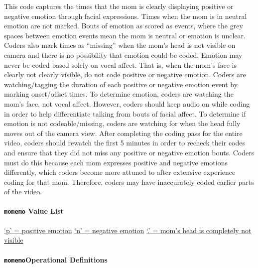 \documentclass[
]{book}
\begin{document}
This code captures the times that the mom is clearly displaying positive or negative emotion through facial expressions. Times when the mom is in neutral emotion are not marked. Bouts of emotion as scored as events, where the grey spaces between emotion events mean the mom is neutral or emotion is unclear. Coders also mark times as ``missing'' when the mom's head is not visible on camera and there is no possibility that emotion could be coded. Emotion may never be coded based solely on vocal affect. That is, when the mom's face is clearly not clearly visible, do not code positive or negative emotion.
Coders are watching/tagging the duration of each positive or negative emotion event by marking onset/offset times. To determine emotion, coders are watching the mom's face, not vocal affect. However, coders should keep audio on while coding in order to help differentiate talking from bouts of facial affect. To determine if emotion is not codeable/missing, coders are watching for when the head fully moves out of the camera view.
After completing the coding pass for the entire video, coders should rewatch the first 5 minutes in order to recheck their codes and ensure that they did not miss any positive or negative emotion bouts. Coders must do this because each mom expresses positive and negative emotions differently, which coders become more attuned to after extensive experience coding for that mom. Therefore, coders may have inaccurately coded earlier parts of the video.

\hypertarget{mom_emo_value_list}{%
\paragraph*{\texorpdfstring{\texttt{momemo} Value List}{momemo Value List}}\label{mom_emo_value_list}}

\protect\hyperlink{mom_pos_emo}{`p' = positive emotion}
\protect\hyperlink{mom_neg_emo}{`n' = negative emotion}
\protect\hyperlink{mom_head_not_visible}{`.' = mom's head is completely not visible}

\hypertarget{momemooperational-definitions}{%
\paragraph*{\texorpdfstring{\texttt{momemo}Operational Definitions}{momemoOperational Definitions}}\label{momemooperational-definitions}}
\end{document}
